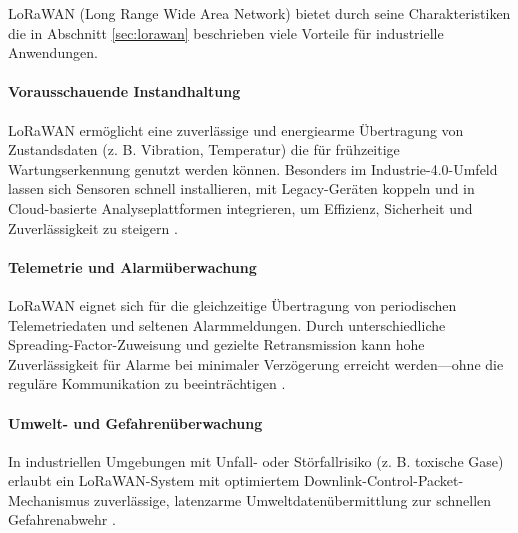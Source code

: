 LoRaWAN (Long Range Wide Area Network) bietet durch seine Charakteristiken die in Abschnitt \ref{sec:lorawan} beschrieben viele Vorteile für industrielle Anwendungen. 

\paragraph*{Vorausschauende Instandhaltung} 
LoRaWAN ermöglicht eine zuverlässige und energiearme Übertragung von Zustandsdaten (z. B. Vibration, Temperatur) die für frühzeitige Wartungserkennung genutzt werden können. Besonders im Industrie-4.0-Umfeld lassen sich Sensoren schnell installieren, mit Legacy-Geräten koppeln und in Cloud-basierte Analyseplattformen integrieren, um Effizienz, Sicherheit und Zuverlässigkeit zu steigern \autocite{lorawansmartindustry}.

\paragraph*{Telemetrie und Alarmüberwachung}
LoRaWAN eignet sich für die gleichzeitige Übertragung von periodischen Telemetriedaten und seltenen Alarmmeldungen. Durch unterschiedliche Spreading-Factor-Zuweisung und gezielte Retransmission kann hohe Zuverlässigkeit für Alarme bei minimaler Verzögerung erreicht werden—ohne die reguläre Kommunikation zu beeinträchtigen \autocite{santos2020}.

\paragraph*{Umwelt- und Gefahrenüberwachung}
In industriellen Umgebungen mit Unfall- oder Störfallrisiko (z. B. toxische Gase) erlaubt ein LoRaWAN-System mit optimiertem Downlink-Control-Packet-Mechanismus zuverlässige, latenzarme Umweltdatenübermittlung zur schnellen Gefahrenabwehr \autocite{tamang2022}.
